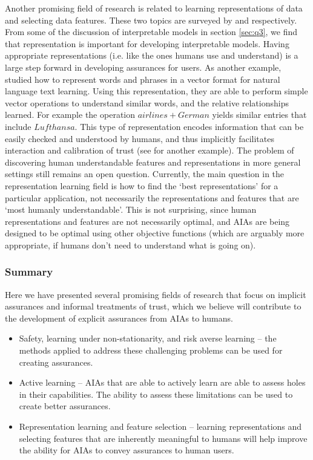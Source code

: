 Another promising field of research is related to learning representations of data and selecting data features. These two topics are surveyed by \citet{Bengio2013-uv} and \citet{Guyon2003-fj} respectively. From some of the discussion of interpretable models in section \ref{sec:q3}, we find that representation is important for developing interpretable models. 
Having appropriate representations (i.e. like the ones humans use and understand) is a large step forward in developing assurances for users. As another example, \citet{Mikolov2013-lt} studied how to represent words and phrases in a vector format for natural language text learning. Using this representation, they are able to perform simple vector operations to understand similar words, and the relative relationships learned. For example the operation $airlines+German$ yields similar entries that include $Lufthansa$. This type of representation encodes information that can be easily checked and understood by humans, and thus implicitly facilitates interaction and calibration of trust (see \cite{Haury2011-zi} for another example). 
The problem of discovering human understandable features and representations in more general settings still remains an open question. Currently, the main question in the representation learning field is how to find the `best representations' for a particular application, not necessarily the representations and features that are `most humanly understandable'. This is not surprising, since human representations and features are not necessarily optimal, and AIAs are being designed to be optimal using other objective functions (which are arguably more appropriate, if humans don't need to understand what is going on). 

\subsubsection{Summary}
    Here we have presented several promising fields of research that focus on implicit assurances and informal treatments of trust, which we believe will contribute to the development of explicit assurances from AIAs to humans.
    \begin{itemize}
        \item Safety, learning under non-stationarity, and risk averse learning -- the methods applied to address these challenging problems can be used for creating assurances.
        \item Active learning -- AIAs that are able to actively learn are able to assess holes in their capabilities. The ability to assess these limitations can be used to create better assurances.
        \item Representation learning and feature selection -- learning representations and selecting features that are inherently meaningful to humans will help improve the ability for AIAs to convey assurances to human users.
    \end{itemize}

